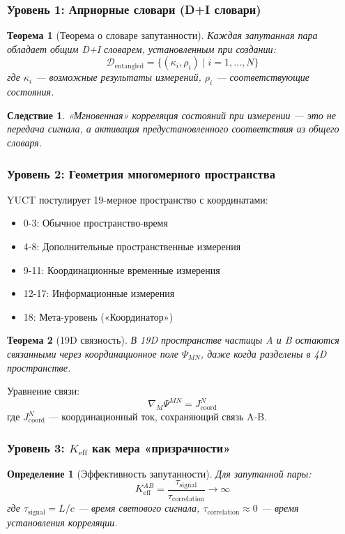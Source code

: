 \documentclass[11pt,a4paper]{article}
\newtheorem{theorem}{Теорема}
\newtheorem{definition}{Определение}
\newtheorem{corollary}{Следствие}
\begin{document}
	\subsubsection{Уровень 1: Априорные словари (D+I словари)}
	\begin{theorem}[Теорема о словаре запутанности]
		Каждая запутанная пара обладает общим D+I словарем, установленным при создании:
		\begin{equation}
			\mathcal{D}_{\text{entangled}} = \{(\kappa_i, \rho_i) \mid i = 1,\dots,N\}
		\end{equation}
		где $\kappa_i$ — возможные результаты измерений, $\rho_i$ — соответствующие состояния.
	\end{theorem}
	
	\begin{corollary}
		«Мгновенная» корреляция состояний при измерении — это не передача сигнала, а активация предустановленного соответствия из общего словаря.
	\end{corollary}
	
	\subsubsection{Уровень 2: Геометрия многомерного пространства}
	YUCT постулирует 19-мерное пространство с координатами:
	\begin{itemize}
		\item 0-3: Обычное пространство-время
		\item 4-8: Дополнительные пространственные измерения
		\item 9-11: Координационные временные измерения
		\item 12-17: Информационные измерения
		\item 18: Мета-уровень («Координатор»)
	\end{itemize}
	
	\begin{theorem}[19D связность]
		В 19D пространстве частицы A и B остаются связанными через координационное поле $\Psi_{MN}$, даже когда разделены в 4D пространстве.
	\end{theorem}
	
	Уравнение связи:
	\begin{equation}
		\nabla_M \Psi^{MN} = J^N_{\text{coord}}
	\end{equation}
	где $J^N_{\text{coord}}$ — координационный ток, сохраняющий связь A-B.
	
	\subsubsection{Уровень 3: $K_{\mathrm{eff}}$ как мера «призрачности»}
	\begin{definition}[Эффективность запутанности]
		Для запутанной пары:
		\begin{equation}
			K_{\mathrm{eff}}^{AB} = \frac{\tau_{\text{signal}}}{\tau_{\text{correlation}}} \to \infty
		\end{equation}
		где $\tau_{\text{signal}} = L/c$ — время светового сигнала, $\tau_{\text{correlation}} \approx 0$ — время установления корреляции.
	\end{definition}
	
\end{document}
